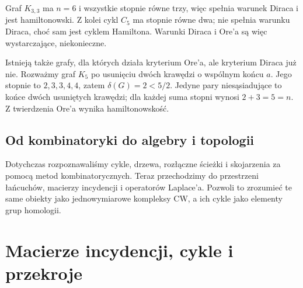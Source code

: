 \begin{przyklad}
Graf $K_{3,3}$ ma $n=6$ i wszystkie stopnie równe trzy,
więc spełnia warunek Diraca i jest hamiltonowski.
Z kolei cykl $C_5$ ma stopnie równe dwa; nie spełnia
warunku Diraca, choć sam jest cyklem Hamiltona.
Warunki Diraca i Ore'a są więc wystarczające, niekonieczne.

Istnieją także grafy, dla których działa kryterium Ore'a,
ale kryterium Diraca już nie. Rozważmy graf $K_5$
po usunięciu dwóch krawędzi o wspólnym końcu $a$.
Jego stopnie to $2,3,3,4,4$, zatem
$\delta(G)=2<5/2$. Jedyne pary niesąsiadujące
to końce dwóch usuniętych krawędzi; dla każdej
suma stopni wynosi $2+3=5=n$.
Z twierdzenia Ore'a wynika hamiltonowskość.
\end{przyklad}

\begin{center}
\end{center}

\section*{Od kombinatoryki do algebry i topologii}

Dotychczas rozpoznawaliśmy cykle, drzewa, rozłączne ścieżki
i skojarzenia za pomocą metod kombinatorycznych. Teraz przechodzimy
do przestrzeni łańcuchów, macierzy incydencji i operatorów Laplace'a.
Pozwoli to zrozumieć te same obiekty jako jednowymiarowe kompleksy
CW, a ich cykle jako elementy grup homologii.



\chapter{Macierze incydencji, cykle i przekroje}
\label{ch:tg-algebra}

